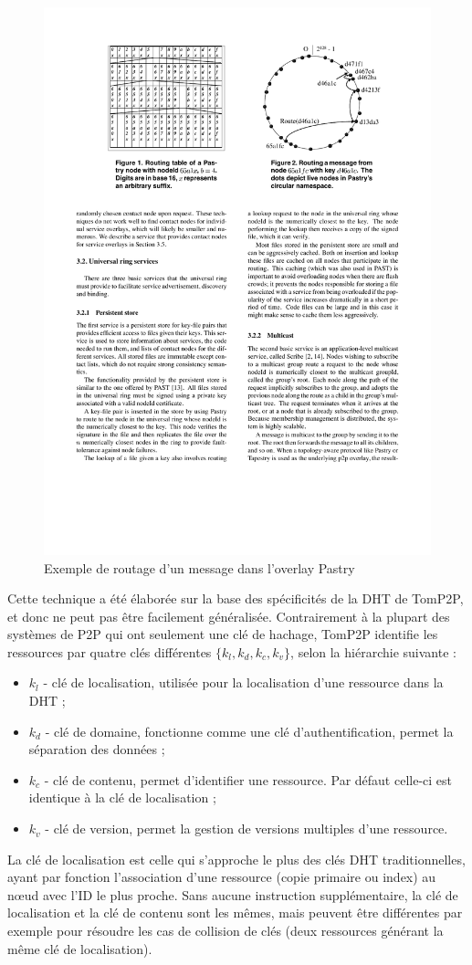 \begin{figure}[!ht]
	\centering
	\includegraphics[width=0.4\linewidth]{img/AnneauPastry.pdf}
	\caption{Exemple de routage d'un message dans l'overlay Pastry \cite{Castro2002}}
	\label{fig:pastry}
\end{figure}


Cette technique a été élaborée sur la base des spécificités de la DHT de TomP2P, et donc ne peut pas être facilement généralisée. Contrairement à la plupart des systèmes de P2P qui ont seulement une clé de hachage, TomP2P identifie les ressources par quatre clés différentes $\{k_l,k_d,k_c,k_v\}$, selon la hiérarchie suivante : 
\begin{itemize}
	\item \textit{$k_l$} - clé de localisation, utilisée pour la localisation d'une ressource dans la DHT ;
	\item \textit{$k_d$} - clé de domaine, fonctionne comme une clé d'authentification, permet la séparation des données ;
	\item \textit{$k_c$} - clé de contenu, permet d'identifier une ressource. Par défaut celle-ci est identique à la clé de localisation ;
	\item \textit{$k_v$} - clé de version, permet la gestion de versions multiples d'une ressource.
\end{itemize} 

La clé de localisation est celle qui s'approche le plus des clés DHT traditionnelles, ayant par fonction l'association d'une ressource (copie primaire ou index) au n{\oe}ud avec l'ID le plus proche. Sans aucune instruction supplémentaire, la clé de localisation et la clé de contenu sont les mêmes, mais peuvent être différentes par exemple pour résoudre les cas de collision de clés (deux ressources générant la même clé de localisation).

